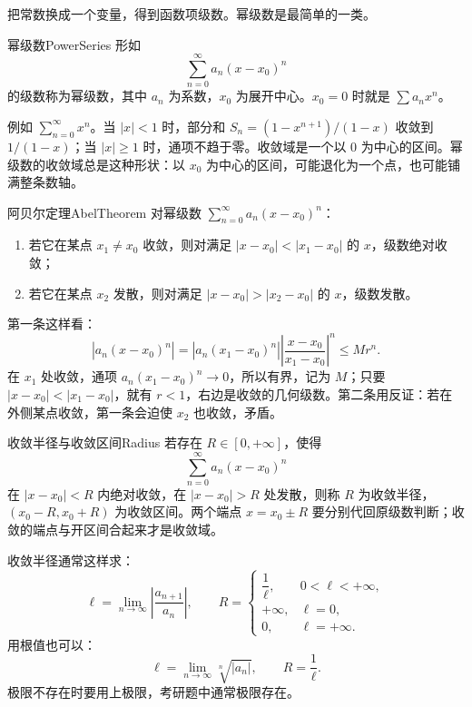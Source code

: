把常数换成一个变量，得到函数项级数。幂级数是最简单的一类。

\begin{mydef}{幂级数}{PowerSeries}
    形如
    \[
        \sum_{n=0}^{\infty}a_n(x-x_0)^n
    \]
    的级数称为幂级数，其中 $a_n$ 为系数，$x_0$ 为展开中心。$x_0=0$ 时就是 $\sum a_nx^n$。
\end{mydef}

例如 $\sum_{n=0}^{\infty}x^n$。当 $|x|<1$ 时，部分和 $S_n=(1-x^{n+1})/(1-x)$ 收敛到 $1/(1-x)$；当 $|x|\ge1$ 时，通项不趋于零。收敛域是一个以 $0$ 为中心的区间。幂级数的收敛域总是这种形状：以 $x_0$ 为中心的区间，可能退化为一个点，也可能铺满整条数轴。

\begin{conclusion}{阿贝尔定理}{AbelTheorem}
    对幂级数 $\sum_{n=0}^{\infty}a_n(x-x_0)^n$：
    \begin{enumerate}
        \item 若它在某点 $x_1\ne x_0$ 收敛，则对满足 $|x-x_0|<|x_1-x_0|$ 的 $x$，级数绝对收敛；
        \item 若它在某点 $x_2$ 发散，则对满足 $|x-x_0|>|x_2-x_0|$ 的 $x$，级数发散。
    \end{enumerate}
\end{conclusion}

第一条这样看：
\[
|a_n(x-x_0)^n|
=|a_n(x_1-x_0)^n|\left|\frac{x-x_0}{x_1-x_0}\right|^n
\le Mr^n.
\]
在 $x_1$ 处收敛，通项 $a_n(x_1-x_0)^n\to0$，所以有界，记为 $M$；只要 $|x-x_0|<|x_1-x_0|$，就有 $r<1$，右边是收敛的几何级数。第二条用反证：若在外侧某点收敛，第一条会迫使 $x_2$ 也收敛，矛盾。

\begin{conclusion}{收敛半径与收敛区间}{Radius}
    若存在 $R\in[0,+\infty]$，使得
    \[
        \sum_{n=0}^{\infty}a_n(x-x_0)^n
    \]
    在 $|x-x_0|<R$ 内绝对收敛，在 $|x-x_0|>R$ 处发散，则称 $R$ 为收敛半径，$(x_0-R,x_0+R)$ 为收敛区间。两个端点 $x=x_0\pm R$ 要分别代回原级数判断；收敛的端点与开区间合起来才是收敛域。
\end{conclusion}

收敛半径通常这样求：
\[
\ell=\lim_{n\to\infty}\left|\frac{a_{n+1}}{a_n}\right|,
\qquad
R=
\begin{cases}
\dfrac1\ell,&0<\ell<+\infty,\\[6pt]
+\infty,&\ell=0,\\
0,&\ell=+\infty.
\end{cases}
\]
用根值也可以：
\[
\ell=\lim_{n\to\infty}\sqrt[n]{|a_n|},
\qquad R=\frac1\ell.
\]
极限不存在时要用上极限，考研题中通常极限存在。

